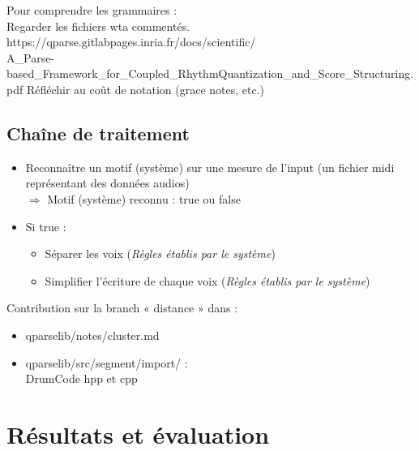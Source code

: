 Pour comprendre les grammaires :\\
Regarder les fichiers wta commentés.\\
https://qparse.gitlabpages.inria.fr/docs/scientific/\\
A\_Parse-based\_Framework\_for\_Coupled\_RhythmQuantization\_and\_Score\_Structuring.pdf
Réfléchir au coût de notation (grace notes, etc.)
\newpage

%


\subsection*{Chaîne de traitement}
\begin{itemize}
	\item Reconnaître un motif (système) sur une mesure de l’input (un fichier midi représentant des données audios)\\ $\Rightarrow$ Motif (système) reconnu : true ou false
	\item Si true : 
	\begin{itemize}
		\item Séparer les voix (\textit{Règles établis par le système})
		\item Simplifier l’écriture de chaque voix (\textit{Règles établis par le système})\\
	\end{itemize}
\end{itemize}

Contribution sur la branch « distance » dans :\\
\begin{itemize}
	\item qparselib/notes/cluster.md
	\item qparselib/src/segment/import/ :\\
	DrumCode hpp et cpp\\
\end{itemize}
\newpage
\section{Résultats et évaluation}
